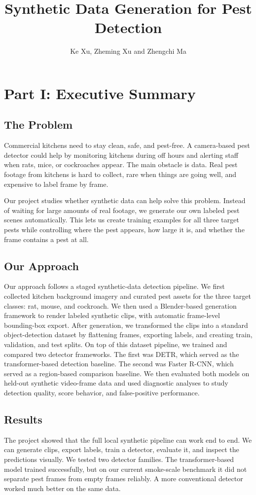 \documentclass[11pt]{article}
\title{Synthetic Data Generation for Pest Detection}
\author{Ke Xu, Zheming Xu and Zhengchi Ma}
\date{}
\begin{document}
\maketitle

\section*{Part I: Executive Summary}

\subsection*{The Problem}
Commercial kitchens need to stay clean, safe, and pest-free. A camera-based pest detector could help by monitoring kitchens during off hours and alerting staff when rats, mice, or cockroaches appear. The main obstacle is data. Real pest footage from kitchens is hard to collect, rare when things are going well, and expensive to label frame by frame.

Our project studies whether synthetic data can help solve this problem. Instead of waiting for large amounts of real footage, we generate our own labeled pest scenes automatically. This lets us create training examples for all three target pests while controlling where the pest appears, how large it is, and whether the frame contains a pest at all.

\subsection*{Our Approach}
Our approach follows a staged synthetic-data detection pipeline. We first collected kitchen background imagery and curated pest assets for the three target classes: rat, mouse, and cockroach. We then used a Blender-based generation framework to render labeled synthetic clips, with automatic frame-level bounding-box export. After generation, we transformed the clips into a standard object-detection dataset by flattening frames, exporting labels, and creating train, validation, and test splits. On top of this dataset pipeline, we trained and compared two detector frameworks. The first was DETR, which served as the transformer-based detection baseline. The second was Faster R-CNN, which served as a region-based comparison baseline. We then evaluated both models on held-out synthetic video-frame data and used diagnostic analyses to study detection quality, score behavior, and false-positive performance.


\subsection*{Results}
The project showed that the full local synthetic pipeline can work end to end. We can generate clips, export labels, train a detector, evaluate it, and inspect the predictions visually. We tested two detector families. The transformer-based model trained successfully, but on our current smoke-scale benchmark it did not separate pest frames from empty frames reliably. A more conventional detector worked much better on the same data.
\end{document}
